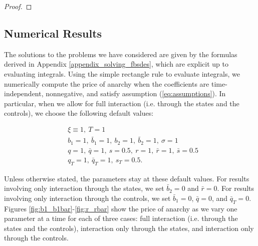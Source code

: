 \documentclass[11pt]{article}
\begin{document}
\begin{proof}
\end{proof}


\subsection{\textbf{Numerical Results}}
The solutions to the problems we have considered are given by the formulas derived in Appendix \ref{appendix_solving_fbsdes}, which are explicit up to evaluating integrals. Using the simple rectangle rule to evaluate integrals, we numerically compute the price of anarchy when the coefficients are time-independent, nonnegative, and satisfy assumption (\ref{eq:assumptions}). In particular, when we allow for full interaction (i.e. through the states and the controls), we choose the following default values:

\begin{equation*}
\begin{split}
    &\xi\equiv 1,\ T=1 \\
    &b_1=1,\  \bar{b}_1=1,\ b_2=1,\ \bar{b}_2=1,\ \sigma=1 \\
    &q=1,\ \bar{q}=1,\ s=0.5,\ r=1,\ \bar{r}=1,\ \bar{s}=0.5 \\
    &q_T=1,\  \bar{q}_T=1,\ s_T=0.5.
\end{split}
\end{equation*}

Unless otherwise stated, the parameters stay at these default values. For results involving only interaction through the states, we set $\bar{b}_2=0$ and $\bar{r}=0$. For results involving only interaction through the controls, we set $\bar{b}_1=0$, $\bar{q}=0$, and $\bar{q}_T=0$. Figures \ref{fig:b1_b1bar}-\ref{fig:r_rbar} show the price of anarchy as we vary one parameter at a time for each of three cases: full interaction (i.e. through the states and the controls), interaction only through the states, and interaction only through the controls.
\end{document}
